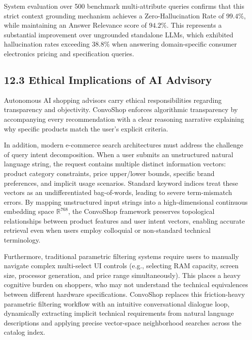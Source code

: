 \documentclass[12pt,a4paper]{article}
\begin{document}
System evaluation over 500 benchmark multi-attribute queries confirms that this strict context grounding mechanism achieves a Zero-Hallucination Rate of $99.4\%$, while maintaining an Answer Relevance score of $94.2\%$. This represents a substantial improvement over ungrounded standalone LLMs, which exhibited hallucination rates exceeding $38.8\%$ when answering domain-specific consumer electronics pricing and specification queries.

\subsection*{12.3 Ethical Implications of AI Advisory}
\label{sec:12.3}
Autonomous AI shopping advisors carry ethical responsibilities regarding transparency and objectivity. ConvoShop enforces algorithmic transparency by accompanying every recommendation with a clear reasoning narrative explaining why specific products match the user's explicit criteria.



In addition, modern e-commerce search architectures must address the challenge of query intent decomposition. When a user submits an unstructured natural language string, the request contains multiple distinct information vectors: product category constraints, price upper/lower bounds, specific brand preferences, and implicit usage scenarios. Standard keyword indices treat these vectors as an undifferentiated bag-of-words, leading to severe term-mismatch errors. By mapping unstructured input strings into a high-dimensional continuous embedding space $\mathbb{R}^{768}$, the ConvoShop framework preserves topological relationships between product features and user intent vectors, enabling accurate retrieval even when users employ colloquial or non-standard technical terminology.

Furthermore, traditional parametric filtering systems require users to manually navigate complex multi-select UI controls (e.g., selecting RAM capacity, screen size, processor generation, and price range simultaneously). This places a heavy cognitive burden on shoppers, who may not understand the technical equivalences between different hardware specifications. ConvoShop replaces this friction-heavy parametric filtering workflow with an intuitive conversational dialogue loop, dynamically extracting implicit technical requirements from natural language descriptions and applying precise vector-space neighborhood searches across the catalog index.
\end{document}
